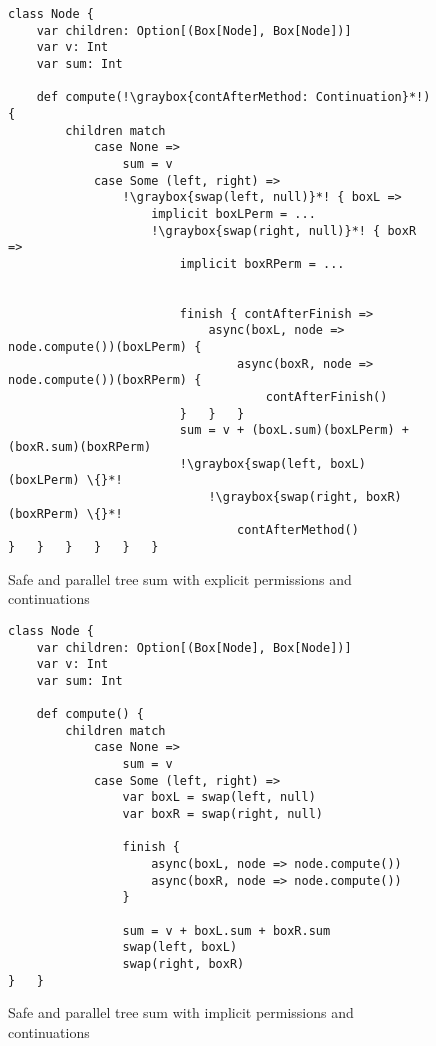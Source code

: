 \begin{figure}
\centering
\begin{lstlisting}
class Node {
	var children: Option[(Box[Node], Box[Node])]
	var v: Int
	var sum: Int

	def compute(!\graybox{contAfterMethod: Continuation}*!) {
 		children match
			case None =>
				sum = v
			case Some (left, right) =>
				!\graybox{swap(left, null)}*! { boxL =>
					implicit boxLPerm = ...
					!\graybox{swap(right, null)}*! { boxR =>
						implicit boxRPerm = ...


						finish { contAfterFinish =>
							async(boxL, node => node.compute())(boxLPerm) {
     							async(boxR, node => node.compute())(boxRPerm) {
									contAfterFinish()
						}	}	}
						sum = v + (boxL.sum)(boxLPerm) + (boxR.sum)(boxRPerm)
						!\graybox{swap(left, boxL)(boxLPerm) \{}*!
							!\graybox{swap(right, boxR)(boxRPerm) \{}*!
								contAfterMethod()
}	}	}	}	}	}
\end{lstlisting}

    \caption{Safe and parallel tree sum with explicit permissions and continuations}
    \label{fig:sum-swap-explicit}
\end{figure}
\begin{figure}
\centering

\begin{lstlisting}
class Node {
	var children: Option[(Box[Node], Box[Node])]
	var v: Int
	var sum: Int

	def compute() {
 		children match
			case None =>
				sum = v
			case Some (left, right) =>
				var boxL = swap(left, null)
				var boxR = swap(right, null)

				finish {
					async(boxL, node => node.compute())
					async(boxR, node => node.compute())
				}

				sum = v + boxL.sum + boxR.sum
				swap(left, boxL)
				swap(right, boxR)
}	}
\end{lstlisting}
    \caption{Safe and parallel tree sum with implicit permissions and continuations}
    \label{fig:sum-swap-implicit}
\end{figure}

